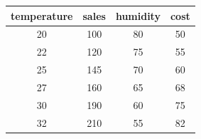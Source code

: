 \begin{tabular}{cccc}
\toprule
temperature & sales & humidity & cost \\
\midrule
20 & 100 & 80 & 50 \\
22 & 120 & 75 & 55 \\
25 & 145 & 70 & 60 \\
27 & 160 & 65 & 68 \\
30 & 190 & 60 & 75 \\
32 & 210 & 55 & 82 \\
\bottomrule
\end{tabular}
